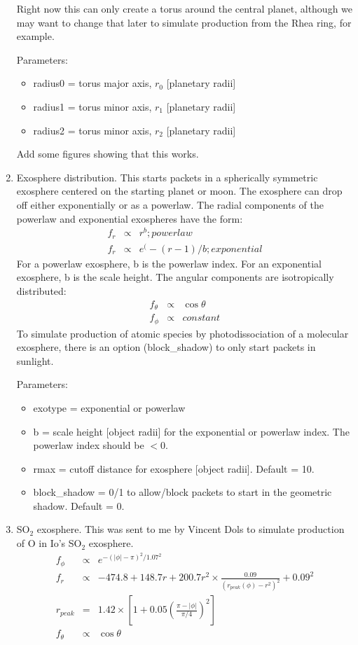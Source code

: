 \documentclass[11pt]{article}
\begin{document}
\begin{enumerate}
Right now this can only create a torus around the central planet, although we
may want to change that later to simulate production from the Rhea ring, for
example.

Parameters:
  \begin{itemize}
  \item radius0 = torus major axis, $r_0$ [planetary radii]
  \item radius1 = torus minor axis, $r_1$ [planetary radii]
  \item radius2 = torus minor axis, $r_2$ [planetary radii]
  \end{itemize}

Add some figures showing that this works.

\item Exosphere distribution. This starts packets in a spherically symmetric
exosphere centered on the starting planet or moon. The exosphere can drop off
either exponentially or as a powerlaw. The radial components of the powerlaw
and exponential exospheres have the form: 
\begin{eqnarray}
f_r & \propto & r^b; powerlaw \\
f_r & \propto & e^(-(r-1)/b; exponential 
\end{eqnarray}
For a powerlaw exosphere, b is the powerlaw index. For an exponential
exosphere, b is the scale height. The angular components are isotropically
distributed:
\begin{eqnarray}
f_\theta & \propto & \cos \theta \\
f_\phi & \propto & constant
\end{eqnarray}
To simulate production of atomic species by photodissociation of a molecular
exosphere, there is an option (block\_shadow) to only start packets in sunlight.

Parameters:
  \begin{itemize}
  \item exotype = exponential or powerlaw
  \item b = scale height [object radii] for the exponential or powerlaw index.
  The powerlaw index should be $<0$.
  \item {\color{red}rmax} = cutoff distance for exosphere [object radii]. 
  Default = 10.
  \item {\color{red}block\_shadow} = 0/1 to allow/block packets to start in the
  geometric shadow. Default = 0.
  \end{itemize}

\item SO$_2$ exosphere. This was sent to me by Vincent Dols to simulate
production of O in Io's SO$_2$ exosphere.
\begin{eqnarray}
f_\phi & \propto & e^{-(|\phi|-\pi)^2/1.07^2} \\
f_r & \propto & -474.8 + 148.7r + 200.7 r^2 \times
  \frac{0.09}{(r_{peak}(\phi)-r^2)^2} + 0.09^2 \\
r_{peak} & = & 1.42 \times \left[1 + 0.05 \left(\frac{\pi
  -|\phi|}{\pi/4}\right)^2 \right] \\
f_{\theta} & \propto & \cos \theta
\end{eqnarray}


\end{enumerate}
\end{document}
